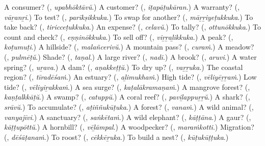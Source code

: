 \begin{tcolorbox}[breakable,colback=teal!4,colframe=teal!35!black,title={Before you move on}]
A consumer? (\textbf{}, \emph{upabhōktāvŭ}.) A customer? (\textbf{}, \emph{iṭapāṭukāran}.) A warranty? (\textbf{}, \emph{vāṟanṟi}.) To test? (\textbf{}, \emph{parīkṣikkuka}.) To swap for another? (\textbf{}, \emph{māṟṟiyeṭukkuka}.) To take back? (\textbf{}, \emph{tiricceṭukkuka}.) An expense? (\textbf{}, \emph{celavŭ}.) To tally? (\textbf{}, \emph{ottunōkkuka}.) To count and check? (\textbf{}, \emph{eṇṇinōkkuka}.) To sell off? (\textbf{}, \emph{viṟṟaḻikkuka}.) A peak? (\textbf{}, \emph{koṭumuṭi}.) A hillside? (\textbf{}, \emph{malañcerivŭ}.) A mountain pass? (\textbf{}, \emph{curaṁ}.) A meadow? (\textbf{}, \emph{pulmēṭŭ}.) Shade? (\textbf{}, \emph{taṇal}.) A large river? (\textbf{}, \emph{nadi}.) A brook? (\textbf{}, \emph{aruvi}.) A water spring? (\textbf{}, \emph{uṟava}.) A dam? (\textbf{}, \emph{aṇakkeṭṭŭ}.) To dry up? (\textbf{}, \emph{vaṟṟuka}.) The coastal region? (\textbf{}, \emph{tīradēśaṁ}.) An estuary? (\textbf{}, \emph{aḻimukhaṁ}.) High tide? (\textbf{}, \emph{vēliyēṟṟaṁ}.) Low tide? (\textbf{}, \emph{vēliyiṟakkaṁ}.) A sea surge? (\textbf{}, \emph{kaṭalākramaṇaṁ}.) A mangrove forest? (\textbf{}, \emph{kaṇṭalkkāṭŭ}.) A swamp? (\textbf{}, \emph{catuppŭ}.) A coral reef? (\textbf{}, \emph{paviḻappuṟṟŭ}.) A shark? (\textbf{}, \emph{srāvŭ}.) To accumulate? (\textbf{}, \emph{aṭiññukūṭuka}.) A forest? (\textbf{}, \emph{vanaṁ}.) A wild animal? (\textbf{}, \emph{vanyajīvi}.) A sanctuary? (\textbf{}, \emph{saṅkētaṁ}.) A wild elephant? (\textbf{}, \emph{kāṭṭāna}.) A gaur? (\textbf{}, \emph{kāṭṭupōttŭ}.) A hornbill? (\textbf{}, \emph{vēḻāmpal}.) A woodpecker? (\textbf{}, \emph{maraṁkotti}.) Migration? (\textbf{}, \emph{dēśāṭanaṁ}.) To roost? (\textbf{}, \emph{cēkkēṟuka}.) To build a nest? (\textbf{}, \emph{kūṭukūṭṭuka}.)
\end{tcolorbox}
